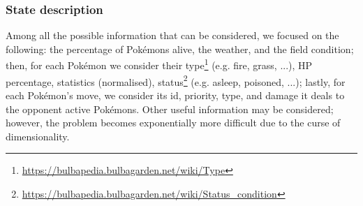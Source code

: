 \subsubsection{State description}
Among all the possible information that can be considered, we focused on the following: the percentage of Pokémons alive, the weather, and the field condition; then, for each Pokémon we consider their type\footnote{\url{https://bulbapedia.bulbagarden.net/wiki/Type}} (e.g. fire, grass, ...), HP percentage, statistics (normalised), status\footnote{\url{https://bulbapedia.bulbagarden.net/wiki/Status_condition}} (e.g. asleep, poisoned, ...); lastly, for each Pokémon's move, we consider its id, priority, type, and damage it deals to the opponent active Pokémons. Other useful information may be considered; however, the problem becomes exponentially more difficult due to the curse of dimensionality.